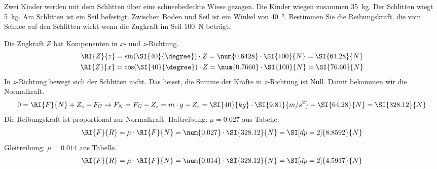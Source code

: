 

\begin{aufgabe}
Zwei Kinder werden mit dem Schlitten über eine schneebedeckte Wiese gezogen. Die Kinder wiegen zusammen \SI{35}{kg}.
Der Schlitten wiegt \SI{5}{kg}. Am Schlitten ist ein Seil befestigt. Zwischen Boden und Seil ist ein Winkel von \SI{40}{\degree}.
Bestimmen Sie die Reibungskraft, die vom Schnee auf den Schlitten wirkt
wenn die Zugkraft im Seil \SI{100}{N} beträgt.



\begin{loesung}
Die Zugkraft $Z$ hat Komponenten in $x$- und $z$-Richtung.
\begin{gather*}
	\RI{Z}{z}=\sin(\SI{40}{\degree})\cdot Z =	\num{0.6428}\cdot\SI{100}{N}=\SI{64.28}{N}\\ 
	\RI{Z}{x}=\cos(\SI{40}{\degree})\cdot Z =	\num{0.7660}\cdot\SI{100}{N}=\SI{76.60}{N} 
\end{gather*}
In $z$-Richtung bewegt sich der Schlitten nicht. Das heisst, die Summe der Kräfte in
$z$-Richtung ist Null. Damit bekommen wir die Normalkraft.
\begin{eqnarray*}
	0=\RI{F}{N}+Z_z - F_G \to F_N= F_G-Z_z=m\cdot g-Z_z=\SI{40}{kg}\cdot\SI{9.81}{m/s^2}-\SI{64.28}{N}=\SI{328.12}{N}
\end{eqnarray*}
Die Reibungskraft ist proportional zur Normalkraft.
Haftreibung: $\mu=0.027$ aus Tabelle.%
\begin{eqnarray*}
	\RI{F}{R}=\mu\cdot \RI{F}{N}= \num{0.027}\cdot\SI{328.12}{N}=\SI[dp=2]{8.8592}{N}
\end{eqnarray*}
Gleitreibung: $\mu=0.014$ aus Tabelle.%
\begin{eqnarray*}
	\RI{F}{R}=\mu\cdot \RI{F}{N}= \num{0.014}\cdot\SI{328.12}{N}=\SI[dp=2]{4.5937}{N}
\end{eqnarray*}


\end{loesung}
\end{aufgabe}


